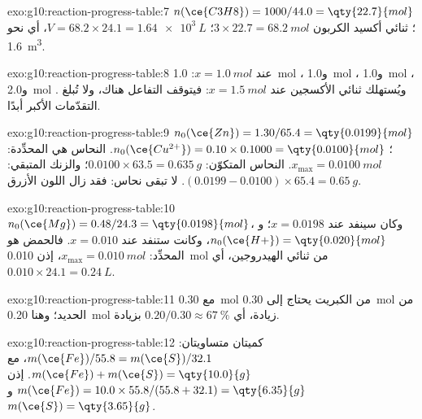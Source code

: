 \begin{solution}{exo:g10:reaction-progress-table:7}
$n(\ce{C3H8}) = 1000 / 44.0 = \qty{22.7}{mol}$؛ ثنائي أكسيد الكربون
$3 \times 22.7 = \qty{68.2}{mol}$؛ $V = 68.2 \times 24.1 =
\qty{1.64e3}{L}$، أي نحو \qty{1.6}{m^3}.
\end{solution}

\begin{solution}{exo:g10:reaction-progress-table:8}
عند $x = \qty{1.0}{mol}$: \qty{1.0}{mol} ، و\qty{1.0}{mol}
، و\qty{1.0}{mol} ، و\qty{2.0}{mol} . ويُستهلك ثنائي
الأكسجين عند $x = \qty{1.5}{mol}$: فيتوقف التفاعل هناك، ولا تُبلغ
التقدّمات الأكبر أبدًا.
\end{solution}

\begin{solution}{exo:g10:reaction-progress-table:9}
$n_0(\ce{Zn}) = 1.30 / 65.4 = \qty{0.0199}{mol}$؛
$n_0(\ce{Cu^{2+}}) = 0.10 \times 0.1000 = \qty{0.0100}{mol}$. 
النحاس هي المحدِّدة: $x_{\max} = \qty{0.0100}{mol}$. النحاس المتكوّن:
$0.0100 \times 63.5 = \qty{0.635}{g}$؛ والزنك المتبقي:
$(0.0199 - 0.0100) \times 65.4 = \qty{0.65}{g}$. لا تبقى  نحاس:
فقد زال اللون الأزرق.
\end{solution}

\begin{solution}{exo:g10:reaction-progress-table:10}
$n_0(\ce{Mg}) = 0.48 / 24.3 = \qty{0.0198}{mol}$، وكان سينفد عند
$x = 0.0198$؛ و$n_0(\ce{H+}) = \qty{0.020}{mol}$، وكانت ستنفد عند
$x = 0.010$. فالحمض هو المحدِّد: $x_{\max} = \qty{0.010}{mol}$، إذن
\qty{0.010}{mol} من ثنائي الهيدروجين، أي $0.010 \times 24.1 = \qty{0.24}{L}$.
\end{solution}

\begin{solution}{exo:g10:reaction-progress-table:11}
 مع \qty{0.30}{mol} من الكبريت يحتاج إلى
\qty{0.30}{mol} من الحديد؛ وهنا \qty{0.20}{mol} زيادة، أي
$0.20 / 0.30 \approx \qty{67}{\percent}$ بزيادة.
\end{solution}

\begin{solution}{exo:g10:reaction-progress-table:12}
كميتان متساويتان: $m(\ce{Fe})/55.8 = m(\ce{S})/32.1$، مع
$m(\ce{Fe}) + m(\ce{S}) = \qty{10.0}{g}$. إذن
$m(\ce{Fe}) = 10.0 \times 55.8 / (55.8 + 32.1) = \qty{6.35}{g}$
و$m(\ce{S}) = \qty{3.65}{g}$.
\end{solution}

